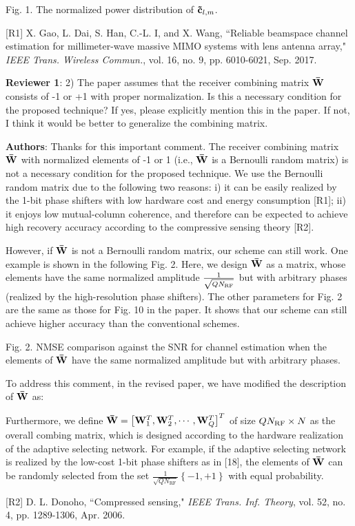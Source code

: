 \documentclass[a4paper,12pt]{article}
\begin{document}
{\vspace*{-10mm}
Fig. 1. The normalized power distribution of ${{\bf{\tilde c}}_{l,m}}$.

[R1] X. Gao, L. Dai, S. Han, C.-L. I, and X. Wang, ``Reliable beamspace channel estimation for millimeter-wave massive MIMO systems with lens antenna array," {\it IEEE Trans. Wireless Commun.}, vol. 16, no. 9, pp. 6010-6021, Sep. 2017.
}

\textbf{Reviewer 1}: 2) The paper assumes that the receiver combining matrix ${{\bf{\bar W}}}$ consists of -1 or +1 with proper normalization. Is this a necessary condition for the proposed technique? If yes, please explicitly mention this in the paper. If not, I think it would be better to generalize the combining matrix.


{\color{blue} \textbf{Authors}: Thanks for this important comment. The receiver combining matrix ${{\bf{\bar W}}}$ with normalized elements of -1 or 1  (i.e., ${{\bf{\bar W}}}$ is a Bernoulli random matrix) is not a necessary condition for the proposed technique. We use the Bernoulli random matrix due to the following two reasons: i) it can be easily realized by the 1-bit phase shifters with low hardware cost and energy consumption [R1]; ii) it enjoys low mutual-column coherence, and therefore can be expected to achieve high recovery accuracy according to the compressive sensing theory [R2].

However, if ${{\bf{\bar W}}}$ is not a Bernoulli random matrix, our scheme can still work. One example is shown in the following Fig. 2. Here, we design ${{\bf{\bar W}}}$ as a matrix, whose elements have the same normalized amplitude ${\frac{1}{{\sqrt {Q{N_{{\rm{RF}}}}} }}}$ but with arbitrary phases (realized by the high-resolution phase shifters). The other parameters for Fig. 2 are the same as those for Fig. 10 in the paper. It shows that our scheme can still achieve higher accuracy than the conventional schemes.


Fig. 2. NMSE comparison against the SNR for channel estimation when the elements of ${{\bf{\bar W}}}$ have the same normalized amplitude but with arbitrary phases.

To address this comment, in the revised paper, we have modified the description of ${{\bf{\bar W}}}$ as:
\begin{framed}
{\color{red} Furthermore, we define
${{\bf{\bar W}} = \left[{{\bf{W}}_1^T,{\bf{W}}_2^T, \cdots ,{\bf{W}}_Q^T} \right]^T}$ of size ${Q{N_{{\rm{RF}}}} \times N}$ as the overall combing matrix, which is designed according to the hardware realization of the adaptive selecting network. For example, if the adaptive selecting network is realized by the low-cost 1-bit phase shifters as in [18], the elements of ${{\bf{\bar W}}}$ can be randomly selected from the set ${\frac{1}{\sqrt{Q{{N}_{\text{RF}}}}}\left\{ -1,+1 \right\}}$ with equal probability.}
\end{framed}

[R2] D. L. Donoho, ``Compressed sensing," {\it IEEE Trans. Inf. Theory}, vol. 52, no. 4, pp. 1289-1306, Apr. 2006.

}
\end{document}
